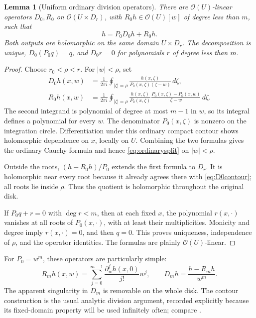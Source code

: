 \documentclass[11pt,oneside]{article}
\numberwithin{equation}{section}
\newtheorem{lemma}[theorem]{Lemma}
\theoremstyle{definition}
\theoremstyle{remark}\newtheorem{remark}[theorem]{Remark}
\newcommand{\OO}{\mathcal O}
\begin{document}
\begin{lemma}[Uniform ordinary division operators]\label{lem:ordinarydivision}
There are \(\OO(U)\)-linear operators \(D_0,R_0\) on \(\OO(U\times D_r)\), with \(R_0h\in\OO(U)[w]\) of degree less than \(m\), such that
\begin{equation}\label{eq:ordinarysplit}
 h=P_0D_0h+R_0h.
\end{equation}
Both outputs are holomorphic on the same domain \(U\times D_r\). The decomposition is unique, \(D_0(P_0q)=q\), and \(D_0r=0\) for polynomials \(r\) of degree less than \(m\).
\end{lemma}
\begin{proof}
Choose \(r_0<\rho<r\). For \(|w|<\rho\), set
\begin{align}
 D_0h(x,w)
 &=\frac1{2\pi i}\oint_{|\zeta|=\rho}
 \frac{h(x,\zeta)}{P_0(x,\zeta)(\zeta-w)}\,d\zeta,
 \label{eq:D0contour}\\
 R_0h(x,w)
 &=\frac1{2\pi i}\oint_{|\zeta|=\rho}
 \frac{h(x,\zeta)}{P_0(x,\zeta)}
 \frac{P_0(x,\zeta)-P_0(x,w)}{\zeta-w}\,d\zeta.
 \label{eq:R0contour}
\end{align}
The second integrand is polynomial of degree at most \(m-1\) in \(w\), so its integral defines a polynomial for every \(w\). The denominator \(P_0(x,\zeta)\) is nonzero on the integration circle. Differentiation under this ordinary compact contour shows holomorphic dependence on \(x\), locally on \(U\). Combining the two formulas gives the ordinary Cauchy formula and hence \eqref{eq:ordinarysplit} on \(|w|<\rho\).

Outside the roots, \((h-R_0h)/P_0\) extends the first formula to \(D_r\). It is holomorphic near every root because it already agrees there with \eqref{eq:D0contour}; all roots lie inside \(\rho\). Thus the quotient is holomorphic throughout the original disk.

If \(P_0q+r=0\) with \(\deg r<m\), then at each fixed \(x\), the polynomial \(r(x,\cdot)\) vanishes at all roots of \(P_0(x,\cdot)\), with at least their multiplicities. Monicity and degree imply \(r(x,\cdot)=0\), and then \(q=0\). This proves uniqueness, independence of \(\rho\), and the operator identities. The formulas are plainly \(\OO(U)\)-linear.
\end{proof}

For \(P_0=w^m\), these operators are particularly simple:
\begin{equation}\label{eq:monomialoperators}
 R_mh(x,w)=\sum_{j=0}^{m-1}\frac{\partial_w^jh(x,0)}{j!}w^j,
 \qquad
 D_mh=\frac{h-R_mh}{w^m}.
\end{equation}
The apparent singularity in \(D_m\) is removable on the whole disk. The contour construction is the usual analytic division argument, recorded explicitly because its fixed-domain property will be used infinitely often; compare \cite[Theorem 6.2.5]{Lebl}.
\end{document}
